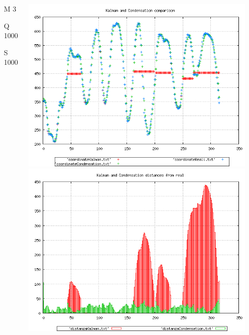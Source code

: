 {\begin{columns}
\begin{scriptsize}
\begin{itemize}
\item [M]3
\item [Q]1000
\item [S]1000
\end{itemize}
\end{scriptsize}
\includegraphics[scale=0.1]{../esperimenti/movie12/mod_3-Q_1000-S_1000/plot.png}\\
\includegraphics[scale=0.1]{../esperimenti/movie12/mod_3-Q_1000-S_1000/plot-distances.png}


\end{columns}}
